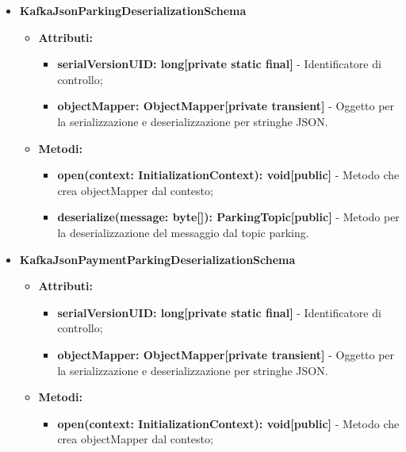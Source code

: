 \documentclass[8pt]{article}
\begin{document}
\begin{itemize}
\begin{itemize}
\begin{itemize}
        \end{itemize}
    \end{itemize}
    \item \textbf{KafkaJsonParkingDeserializationSchema}
    \begin{itemize}
        \item \textbf{Attributi:}
        \begin{itemize}
            \item \textbf{serialVersionUID: long[private static final]} - Identificatore di controllo;
            \item \textbf{objectMapper: ObjectMapper[private transient]} - Oggetto per la serializzazione e deserializzazione per stringhe JSON.
        \end{itemize}
    \end{itemize}
    \begin{itemize}
        \item \textbf{Metodi:}
        \begin{itemize}
            \item \textbf{open(context: InitializationContext): void[public]} - Metodo che crea objectMapper dal contesto;
            \item \textbf{deserialize(message: byte[]): ParkingTopic[public]} - Metodo per la deserializzazione del messaggio dal topic parking.
        \end{itemize}
    \end{itemize}
    \item \textbf{KafkaJsonPaymentParkingDeserializationSchema}
    \begin{itemize}
        \item \textbf{Attributi:}
        \begin{itemize}
            \item \textbf{serialVersionUID: long[private static final]} - Identificatore di controllo;
            \item \textbf{objectMapper: ObjectMapper[private transient]} - Oggetto per la serializzazione e deserializzazione per stringhe JSON.
        \end{itemize}
    \end{itemize}
    \begin{itemize}
        \item \textbf{Metodi:}
        \begin{itemize}
            \item \textbf{open(context: InitializationContext): void[public]} - Metodo che crea objectMapper dal contesto;

\end{itemize}
\end{itemize}
\end{itemize}
\end{document}
